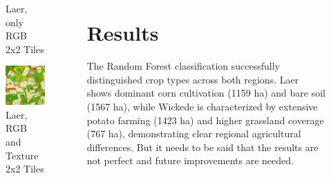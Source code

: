 \documentclass[
  t,%
]{_style/tudelft-beamerposter}
\begin{document}
\begin{frame}
\begin{columns}[onlytextwidth, T]
\begin{column}{}
\begin{figure}[h!]
\begin{minipage}{.5\textwidth}
                \caption{Laer, only RGB 2x2 Tiles}
                \label{fig:enter-label}
            \end{minipage}%
            \begin{minipage}{.5\textwidth}
                \centering
                \includegraphics[scale=0.45]{graphs/textureAndColour2x2laer.png}
                \caption{Laer, RGB and Texture 2x2 Tiles}
                \label{fig:enter-label}
            \end{minipage}%
        \end{figure}

    \end{column}
    \begin{column}{}
      \section*{Results}
      \justifying
      The Random Forest classification successfully distinguished crop types across both regions. Laer shows dominant corn cultivation (1159 ha) and bare soil (1567 ha), while Wickede is characterized by extensive potato farming (1423 ha) and higher grassland coverage (767 ha), demonstrating clear regional agricultural differences. But it needs to be said that the results are not perfect and future improvements are needed.


\end{column}
\end{columns}
\end{frame}
\end{document}
